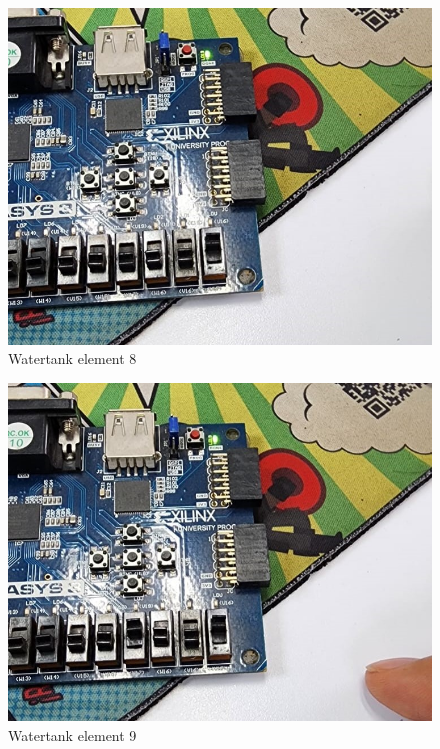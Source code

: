 \documentclass{article}
\begin{document}
\begin{multicols}{2}
	\begin{figure}[H]
		\centering
		\includegraphics[width=1\linewidth]{images/diagrams/watertank/watertank8.jpg}
		\caption{Watertank element 8}
		\label{Watertank element 8 Apendix}
	\end{figure}

	\begin{figure}[H]
		\centering
		\includegraphics[width=1\linewidth]{images/diagrams/watertank/watertank9.jpg}
		\caption{Watertank element 9}
		\label{Watertank element 9 Apendix}
	\end{figure}


\end{multicols}
\end{document}
